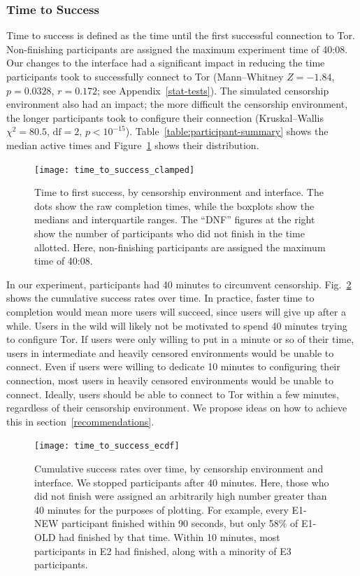 \documentclass[USenglish,oneside,twocolumn]{article}
\begin{document}
{\subsubsection{Time to Success} 
Time to success is defined as the time until the first successful connection to Tor. Non-finishing participants are assigned the maximum experiment time of 40:08.  Our changes to the interface had a significant impact in reducing the time participants took to successfully connect to Tor (Mann--Whitney $Z = -1.84$, $p = 0.0328$, $r= 0.172$; see Appendix~\ref{stat-tests}). The simulated censorship environment also had an impact; the more difficult the censorship environment, the longer participants took to configure their connection (Kruskal--Wallis $\chi^2 = 80.5$, $\mbox{df} = 2$, $p < 10^{-15}$). 
Table~\ref{table:participant-summary} shows the median active times and Figure~\ref{fig:time_to_success_clamped} shows their distribution.

\begin{figure}[t]
\centering
\texttt{[image: time\_to\_success\_clamped]}
\caption{
Time to first success, by censorship environment and interface.
The dots show the raw completion times,
while the boxplots show the medians and interquartile ranges.
The ``DNF'' figures at the right show the number of participants 
who did not finish in the time allotted.
Here, non-finishing participants are assigned the maximum time of 40:08.
}
\label{fig:time_to_success_clamped}
\end{figure}

In our experiment, participants had 40 minutes to circumvent censorship. Fig.~\ref{fig:time_to_success_ecdf} shows the cumulative success rates over time. In practice, faster time to completion would mean more users will succeed, since users will give up after a while. Users in the wild will likely not be motivated to spend 40 minutes trying to configure Tor. If users were only willing to put in a minute or so of their time, users in intermediate and heavily censored environments would be unable to connect. Even if users were willing to dedicate 10 minutes to configuring their connection, most users in heavily censored environments would be unable to connect. Ideally, users should be able to connect to Tor within a few minutes, regardless of their censorship environment. We propose ideas on how to achieve this in section~\ref{recommendations}. 

\begin{figure}[t]
\centering
\texttt{[image: time\_to\_success\_ecdf]}

\caption{
Cumulative success rates over time, by censorship environment and interface.
We stopped participants after 40 minutes. Here, those who did not finish were assigned
an arbitrarily high number greater than 40 minutes for the purposes of plotting. 
For example, every E1-NEW participant finished within 90 seconds,
but only 58\% of E1-OLD had finished by that time. Within 10 minutes, most
participants in E2 had finished, along with a minority of E3 participants. 
}
\label{fig:time_to_success_ecdf}
\end{figure}

}
\end{document}
